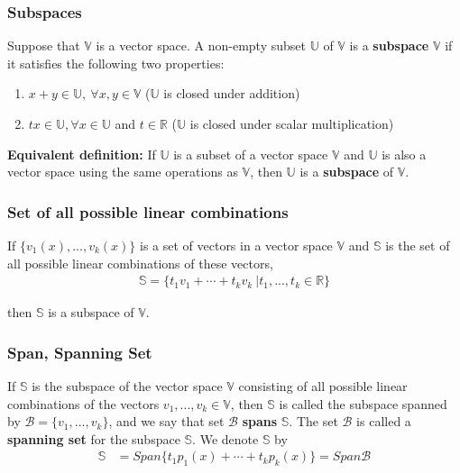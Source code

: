 \documentclass[a4paper,9pt]{extarticle}
\begin{document}
\begin{multicols*}{2}

\subsubsection{Subspaces}
Suppose that $\mathbb{V}$ is a vector space. A non-empty subset $\mathbb{U}$ of $\mathbb{V}$ is a \textbf{subspace} $\mathbb{V}$ if it satisfies the following two properties:
\begin{enumerate}[label=\bfseries S(\arabic*)] \itemsep0pt \parskip0pt 
    \item $x + y \in \mathbb{U}, \> \forall x, y \in \mathbb{V}$ ($\mathbb{U}$ is closed under addition)
    \item $t x \in \mathbb{U}, \forall x \in \mathbb{U}$ and $t \in \mathbb{R}$ ($\mathbb{U}$ is closed under scalar multiplication)
\end{enumerate}

\textbf{Equivalent definition:} If $\mathbb{U}$ is a subset of a vector space $\mathbb{V}$ and $\mathbb{U}$ is also a vector space using the same operations as $\mathbb{V}$, then $\mathbb{U}$ is a \textbf{subspace} of $\mathbb{V}$.


\subsubsection{Set of all possible linear combinations}
If $\{v_1(x), ..., v_k(x)\}$ is a set of vectors in a vector space $\mathbb{V}$ and $\mathbb{S}$ is the set of all possible linear combinations of these vectors,
\begin{equation} \label{4.2-1}
    \begin{split}
        \mathbb{S} = \{t_1 v_1 + \cdots + t_k v_k \> | t_1, ..., t_k \in \mathbb{R}\}
    \end{split}
\end{equation}

then $\mathbb{S}$ is a subspace of $\mathbb{V}$.


\subsubsection{Span, Spanning Set}
If $\mathbb{S}$ is the subspace of the vector space $\mathbb{V}$ consisting of all possible linear combinations of the vectors $v_1, ..., v_k \in \mathbb{V}$, then $\mathbb{S}$ is called the subspace spanned by $\mathcal{B} = \{v_1, ..., v_k\}$, and we say that set $\mathcal{B}$ \textbf{spans} $\mathbb{S}$. The set $\mathcal{B}$ is called a \textbf{spanning set} for the subspace $\mathbb{S}$. We denote $\mathbb{S}$ by
\begin{equation} \label{4.2-2}
    \begin{split}
        \mathbb{S} & = Span \{t_1 p_1(x) + \cdots + t_k p_k(x)\} = Span \mathcal{B}
    \end{split}
\end{equation}


\end{multicols*}
\end{document}
